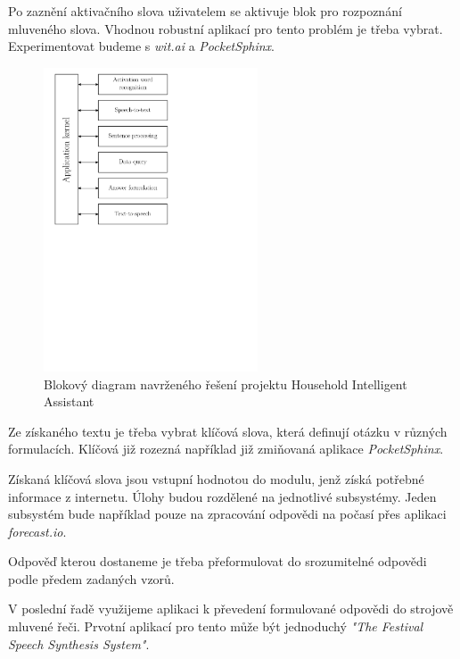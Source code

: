 \documentclass[12pt,a4paper]{article}
\begin{document}
Po zaznění aktivačního slova uživatelem se aktivuje blok pro rozpoznání mluveného slova. Vhodnou robustní aplikací pro tento problém je třeba vybrat. Experimentovat budeme s \textit{wit.ai} a \textit{PocketSphinx}.

\begin{figure}[ht!]
	\begin{center}
	\includegraphics[height = 9cm]{blockDiagram.pdf}
	\caption{Blokový diagram navrženého řešení projektu Household Intelligent Assistant}
	\label{fig:diagram api}
	\end{center}
\end{figure}

Ze získaného textu je třeba vybrat klíčová slova, která definují otázku v různých formulacích. Klíčová již rozezná například již zmiňovaná aplikace \textit{PocketSphinx}.


Získaná klíčová slova jsou vstupní hodnotou do modulu, jenž získá potřebné informace z internetu. Úlohy budou rozdělené na jednotlivé subsystémy. Jeden subsystém bude například pouze na zpracování odpovědi na počasí přes aplikaci \textit{forecast.io}.

Odpověď kterou dostaneme je třeba přeformulovat do srozumitelné odpovědi podle předem zadaných vzorů. 

V poslední řadě využijeme aplikaci k převedení formulované odpovědi do strojově mluvené řeči. Prvotní aplikací pro tento může být jednoduchý \textit{"The Festival Speech Synthesis System"}.

\end{document}
